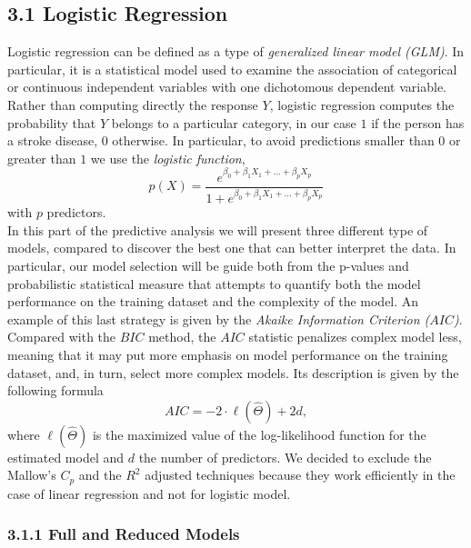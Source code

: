 \documentclass[
]{article}
\begin{document}
\hypertarget{logistic-regression}{%
\subsection{3.1 Logistic Regression}\label{logistic-regression}}

Logistic regression can be defined as a type of \emph{generalized linear
model (GLM)}. In particular, it is a statistical model used to examine
the association of categorical or continuous independent variables with
one dichotomous dependent variable.\\
Rather than computing directly the response \(Y\), logistic regression
computes the probability that \(Y\) belongs to a particular category, in
our case \(1\) if the person has a stroke disease, \(0\) otherwise. In particular, to avoid predictions smaller than \(0\) or greater than \(1\) we use the \textit{logistic function},
\[ p(X) = \frac{e^{\beta_0 + \beta_1 X_1 + \dots + \beta_pX_p}}{1+e^{\beta_0 + \beta_1 X_1+ \dots + \beta_pX_p}}\]
with $p$ predictors.\\
In this part of the predictive analysis we will present three different
type of models, compared to discover the best one that can better
interpret the data. In particular, our model selection will be guide
both from the p-values and probabilistic statistical measure that
attempts to quantify both the model performance on the training dataset
and the complexity of the model. An example of this last strategy is
given by the \emph{Akaike Information Criterion (\(AIC\))}.\\
Compared with the \(BIC\) method, the \(AIC\) statistic penalizes
complex model less, meaning that it may put more emphasis on model
performance on the training dataset, and, in turn, select more complex
models. Its description is given by the following formula
\[ AIC = -2 \cdot \ell(\hat \Theta ) + 2d,\] where
\(\ell(\hat \Theta )\) is the maximized value of the log-likelihood
function for the estimated model and \(d\) the number of predictors. We
decided to exclude the Mallow's \(C_p\) and the \(R^2\) adjusted
techniques because they work efficiently in the case of linear
regression and not for logistic model.

\hypertarget{full-and-reduced-models}{%
\subsubsection{3.1.1 Full and Reduced
Models}\label{full-and-reduced-models}}
\end{document}
